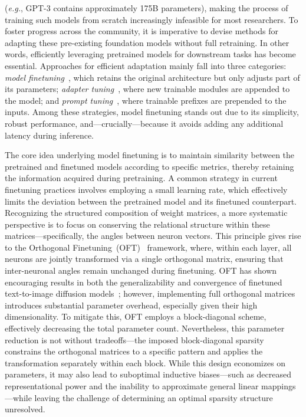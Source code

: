 (\emph{e.g.}, GPT-3 contains approximately 175B parameters), making the process of training such models from scratch increasingly infeasible for most researchers. To foster progress across the community, it is imperative to devise methods for adapting these pre-existing foundation models without full retraining. In other words, efficiently leveraging pretrained models for downstream tasks has become essential. Approaches for efficient adaptation mainly fall into three categories: \emph{model finetuning}~\cite{hulora2022,zaken2022bitfit,guo2020parameter,raffel2020exploring,qiu2023controlling,zhang2022adaptive,chavan2023one}, which retains the original architecture but only adjusts part of its parameters; \emph{adapter tuning}~\cite{rebuffi2017learning,houlsby2019parameter,pfeiffer2020adapterfusion,lin2020exploring,he2021towards}, where new trainable modules are appended to the model; and \emph{prompt tuning}~\cite{li2021prefix,lester2021power}, where trainable prefixes are prepended to the inputs. Among these strategies, model finetuning stands out due to its simplicity, robust performance, and—crucially—because it avoids adding any additional latency during inference.

The core idea underlying model finetuning is to maintain similarity between the pretrained and finetuned models according to specific metrics, thereby retaining the information acquired during pretraining. A common strategy in current finetuning practices involves employing a small learning rate, which effectively limits the deviation between the pretrained model and its finetuned counterpart. Recognizing the structured composition of weight matrices, a more systematic perspective is to focus on conserving the relational structure within these matrices—specifically, the angles between neuron vectors. This principle gives rise to the Orthogonal Finetuning~(OFT)~\cite{qiu2023controlling} framework, where, within each layer, all neurons are jointly transformed via a single orthogonal matrix, ensuring that inter-neuronal angles remain unchanged during finetuning. OFT has shown encouraging results in both the generalizability and convergence of finetuned text-to-image diffusion models~\cite{qiu2023controlling}; however, implementing full orthogonal matrices introduces substantial parameter overhead, especially given their high dimensionality. To mitigate this, OFT employs a block-diagonal scheme, effectively decreasing the total parameter count. Nevertheless, this parameter reduction is not without tradeoffs—the imposed block-diagonal sparsity constrains the orthogonal matrices to a specific pattern and applies the transformation separately within each block. While this design economizes on parameters, it may also lead to suboptimal inductive biases—such as decreased representational power and the inability to approximate general linear mappings—while leaving the challenge of determining an optimal sparsity structure unresolved.

